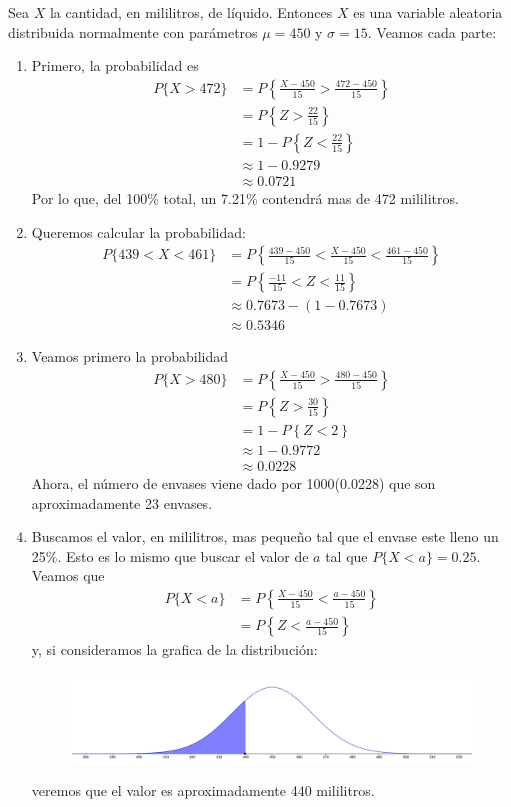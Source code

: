 \begin{sol}
	Sea $X$ la cantidad, en mililitros, de líquido. Entonces $X$ es una variable aleatoria distribuida normalmente con parámetros $\mu = 450$ y $\sigma = 15$. Veamos cada parte:
	\begin{enumerate}
		\item Primero, la probabilidad es
		\begin{align*}
		P\{X>472\} &= P\left\{ \frac{X-450}{15} > \frac{472-450}{15} \right\} \\
		&= P\left\{ Z > \frac{22}{15} \right\} \\
		&= 1-P\left\{ Z < \frac{22}{15} \right\} \\
		&\approx 1-0.9279 \\
		&\approx 0.0721
		\end{align*}
		Por lo que, del 100\% total, un 7.21\% contendrá mas de 472 mililitros.
		\item Queremos calcular la probabilidad:
		\small
		\begin{align*}
		P\{439<X<461\} &= P\left\{ \frac{439-450}{15} < \frac{X-450}{15} < \frac{461-450}{15} \right\} \\
		&= P\left\{ \frac{-11}{15} < Z < \frac{11}{15} \right\} \\
		&\approx 0.7673-(1-0.7673)\\
		&\approx 0.5346
		\end{align*}
		\normalsize
		\item Veamos primero la probabilidad
		\begin{align*}
		P\{X>480\} &= P\left\{ \frac{X-450}{15} > \frac{480-450}{15} \right\} \\
		&= P\left\{ Z > \frac{30}{15} \right\} \\
		&= 1-P\left\{ Z < 2 \right\} \\
		&\approx 1-0.9772 \\
		&\approx 0.0228
		\end{align*}
		Ahora, el número de envases viene dado por 1000(0.0228) que son aproximadamente 23 envases.
		\item Buscamos el valor, en mililitros, mas pequeño tal que el envase este lleno un 25\%. Esto es lo mismo que buscar el valor de $a$ tal que $P\{X<a\} = 0.25$. Veamos que
		\begin{align*}
			P\{X<a\} &= P\left\{ \frac{X-450}{15} < \frac{a-450}{15} \right\} \\
					 &= P\left\{ Z < \frac{a-450}{15} \right\}
		\end{align*}
		y, si consideramos la grafica de la distribución:
			\begin{figure}[H]
			\includegraphics[width=0.6\linewidth]{pics/p2}
			\centering
		\end{figure}
		veremos que el valor es aproximadamente 440 mililitros.
	\end{enumerate}
\end{sol}
